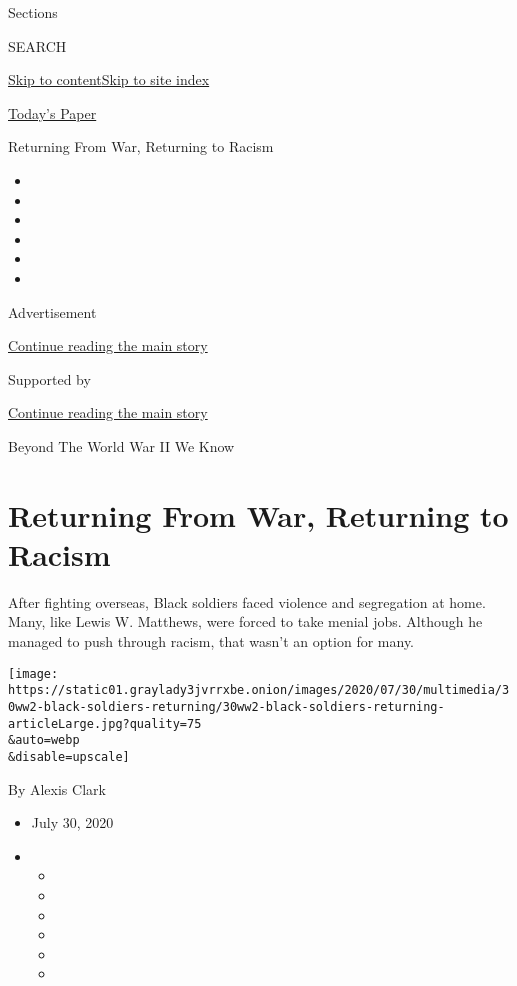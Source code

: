 Sections

SEARCH

\protect\hyperlink{site-content}{Skip to
content}\protect\hyperlink{site-index}{Skip to site index}

\href{https://myaccount.nytimes3xbfgragh.onion/auth/login?response_type=cookie\&client_id=vi}{}

\href{https://www.nytimes3xbfgragh.onion/section/todayspaper}{Today's
Paper}

Returning From War, Returning to Racism

\begin{itemize}
\item
\item
\item
\item
\item
\item
\end{itemize}

Advertisement

\protect\hyperlink{after-top}{Continue reading the main story}

Supported by

\protect\hyperlink{after-sponsor}{Continue reading the main story}

Beyond The World War II We Know

\hypertarget{returning-from-war-returning-to-racism}{%
\section{Returning From War, Returning to
Racism}\label{returning-from-war-returning-to-racism}}

After fighting overseas, Black soldiers faced violence and segregation
at home. Many, like Lewis W. Matthews, were forced to take menial jobs.
Although he managed to push through racism, that wasn't an option for
many.

\texttt{[image: https://static01.graylady3jvrrxbe.onion/images/2020/07/30/multimedia/30ww2-black-soldiers-returning/30ww2-black-soldiers-returning-articleLarge.jpg?quality=75\\\&auto=webp\\\&disable=upscale]}

By Alexis Clark

\begin{itemize}
\item
  July 30, 2020
\item
  \begin{itemize}
  \item
  \item
  \item
  \item
  \item
  \item
  \end{itemize}
\end{itemize}

